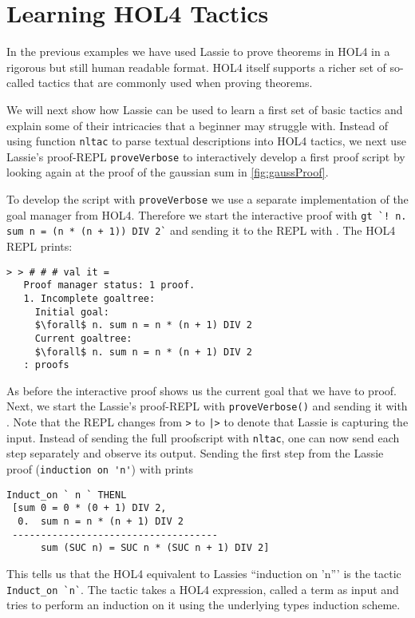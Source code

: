 \section{Learning HOL4 Tactics}

In the previous examples we have used Lassie to prove theorems in HOL4 in a
rigorous but still human readable format.
HOL4 itself supports a richer set of so-called tactics that are commonly used
when proving theorems.

We will next show how Lassie can be used to learn a first set of basic tactics
and explain some of their intricacies that a beginner may struggle with.
Instead of using function \lstinline{nltac} to parse textual descriptions into HOL4
tactics, we next use Lassie's proof-REPL \lstinline{proveVerbose} to interactively
develop a first proof script by looking again at the proof of the gaussian sum
in \autoref{fig:gaussProof}.

To develop the script with \lstinline{proveVerbose} we use a separate
implementation of the goal manager from HOL4.
Therefore we start the interactive proof with \lstinline{gt `! n. sum n = (n * (n + 1)) DIV 2`}
and sending it to the REPL with .
The HOL4 REPL prints:
\begin{lstlisting}[frame=single, mathescape=true, deletekeywords={Proof}]
> > # # # val it =
   Proof manager status: 1 proof.
   1. Incomplete goaltree:
     Initial goal:
     $\forall$ n. sum n = n * (n + 1) DIV 2
     Current goaltree:
     $\forall$ n. sum n = n * (n + 1) DIV 2
   : proofs
\end{lstlisting}

As before the interactive proof shows us the current goal that we have to proof.
Next, we start the Lassie's proof-REPL with \lstinline{proveVerbose()} and
sending it with .
Note that the REPL changes from \lstinline{>} to \lstinline{|>} to denote that
Lassie is capturing the input.
Instead of sending the full proofscript with \lstinline{nltac}, one can now send
each step separately and observe its output.
Sending the first step from the Lassie proof (\lstinline{induction on 'n'}) with
 prints
%
\begin{lstlisting}[frame=single]
Induct_on ` n ` THENL
 [sum 0 = 0 * (0 + 1) DIV 2,
  0.  sum n = n * (n + 1) DIV 2
 ------------------------------------
      sum (SUC n) = SUC n * (SUC n + 1) DIV 2]
\end{lstlisting}

This tells us that the HOL4 equivalent to Lassies ``induction on 'n''' is the
tactic \lstinline{Induct_on `n`}.
The tactic takes a HOL4 expression, called a term as input and tries to perform
an induction on it using the underlying types induction scheme.

